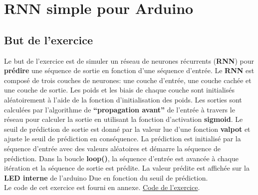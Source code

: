 \chapter{RNN simple pour Arduino}

\section{But de l'exercice}
Le but de l'exercice est de simuler un réseau de neurones récurrents (\textbf{RNN}) pour \textbf{prédire} une séquence de sortie en fonction d'une séquence d'entrée. 
Le \textbf{RNN} est composé de trois couches de neurones: une couche d'entrée, une couche cachée et une
couche de sortie. Les poids et les biais de chaque couche sont initialisés aléatoirement à l'aide
de la fonction d'initialisation des poids. Les sorties sont calculées par l'algorithme de
\textbf{``propagation avant''} de l'entrée à travers le réseau pour calculer la sortie en utilisant la fonction
d'activation \textbf{sigmoid}. Le seuil de prédiction de sortie est donné par la valeur lue d'une
fonction \textbf{valpot} et ajuste le seuil de prédiction en conséquence. La prédiction est initialisé par
la séquence d'entrée avec des valeurs aléatoires et démarre la séquence de prédiction. Dans
la boucle \textbf{loop()}, la séquence d'entrée est avancée à chaque itération et la séquence de sortie
est prédite. La valeur prédite est affichée sur la \textbf{LED interne} de l'arduino Due en fonction du
seuil de prédiction. \\

Le code de cet exercice est fourni en annexe. \hyperref[sec:RNN-code]{Code de l'exercice}.

